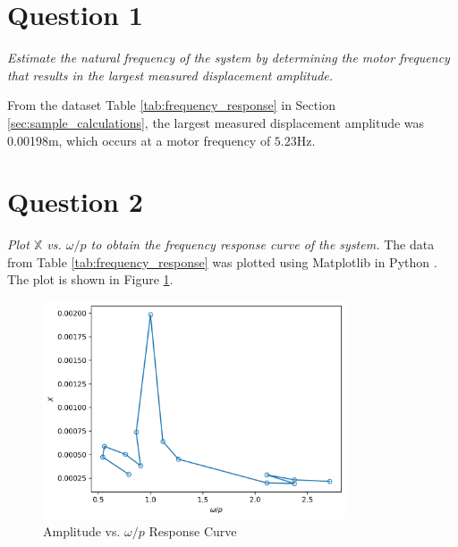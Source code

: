 \section{Question 1}
\textit{Estimate the natural frequency of the system by determining the motor frequency that results in the largest measured displacement amplitude.}

From the dataset Table \ref{tab:frequency_response} in Section \ref{sec:sample_calculations}, the largest measured displacement amplitude was 0.00198m, which occurs at a motor frequency of $\boxed{5.23 \text{Hz}}$.

\section{Question 2}
\textit{Plot $\mathbb{X}$ vs. $\omega/p$ to obtain the frequency response curve of the system.}
The data from Table \ref{tab:frequency_response} was plotted using Matplotlib in Python \cite{matplotlib}. The plot is shown in Figure \ref{fig:frequency_response_curve}. 
\begin{figure}[H]
    \centering
    \includegraphics[width=0.8\textwidth]{Questions/Plots/X_vs_omega_p.png}
    \caption{Amplitude vs. $\omega/p$ Response Curve}
    \label{fig:frequency_response_curve}
\end{figure}

